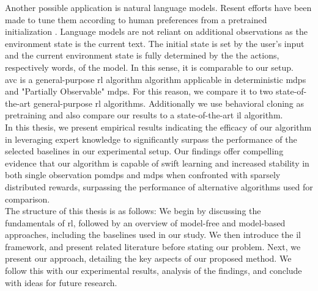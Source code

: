 Another possible application is natural language models. Resent efforts have been made to tune 
them according to human preferences from a pretrained initialization \cite{cite:ChatGPT}. Language models are not reliant on additional observations as the environment state is the current 
text. The initial state is set by the user's input and the current environment state is fully determined by the the actions, respectively words, of the model. 
In this sense, it is comparable to our setup.\\


\ac{avc} is a general-purpose \ac{rl} algorithm algorithm applicable in deterministic \ac{mdp}s and "Partially Observable" \ac{mdp}s. 
For this reason, we compare it to two state-of-the-art general-purpose \ac{rl} algorithms. Additionally we use behavioral cloning as pretraining  
and also compare our results to a state-of-the-art \ac{il} algorithm.\\

In this thesis, we present empirical results indicating the efficacy of our algorithm in leveraging expert knowledge to significantly surpass the performance of the selected baselines in our 
experimental setup. Our findings offer compelling evidence that our algorithm is capable of swift learning and increased stability in both single observation \ac{pomdp}s and \ac{mdp}s when confronted with 
sparsely distributed rewards, surpassing the performance of alternative algorithms used for comparison.\\

The structure of this thesis is as follows: We begin by discussing the fundamentals of \ac{rl}, followed by an overview of model-free and model-based approaches, 
including the baselines used in our study. We then introduce the \ac{il} framework, and present related literature before stating our problem. 
Next, we present our approach, detailing the key aspects of our proposed method. We follow this with our experimental results, analysis of the findings, and conclude with ideas for future research.